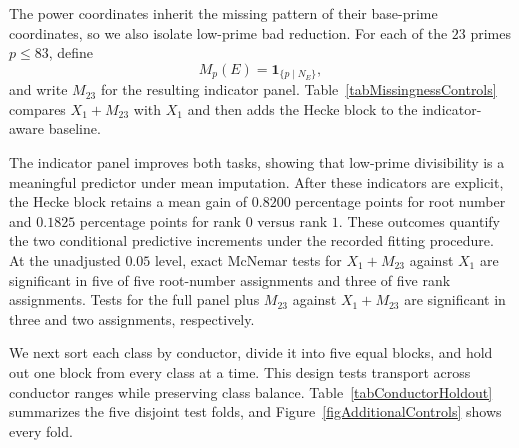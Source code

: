 \documentclass[12pt,reqno]{amsart}
\numberwithin{equation}{section}
\theoremstyle{plain}
\theoremstyle{definition}
\theoremstyle{remark}
\begin{document}
The power coordinates inherit the missing pattern of their base-prime coordinates, so we also isolate low-prime bad reduction.
For each of the $23$ primes $p\leq83$, define
\begin{equation*}
M_p(E)={\boldsymbol 1}_{\{p\mid N_E\}},
\end{equation*}
and write $M_{23}$ for the resulting indicator panel.
Table~\ref{tabMissingnessControls} compares $X_1+M_{23}$ with $X_1$ and then adds the Hecke block to the indicator-aware baseline.

\begin{table}[t]
\centering
\caption{Explicit low-prime missingness controls over the five matched random assignments.
Accuracy and changes use the same units as Table~\ref{tabAdditionalRandom}; parenthetical fractions count positive changes.}
\label{tabMissingnessControls}
\end{table}

The indicator panel improves both tasks, showing that low-prime divisibility is a meaningful predictor under mean imputation.
After these indicators are explicit, the Hecke block retains a mean gain of $0.8200$ percentage points for root number and $0.1825$ percentage points for rank $0$ versus rank $1$.
These outcomes quantify the two conditional predictive increments under the recorded fitting procedure.
At the unadjusted $0.05$ level, exact McNemar tests for $X_1+M_{23}$ against $X_1$ are significant in five of five root-number assignments and three of five rank assignments.
Tests for the full panel plus $M_{23}$ against $X_1+M_{23}$ are significant in three and two assignments, respectively.

We next sort each class by conductor, divide it into five equal blocks, and hold out one block from every class at a time.
This design tests transport across conductor ranges while preserving class balance.
Table~\ref{tabConductorHoldout} summarizes the five disjoint test folds, and Figure~\ref{figAdditionalControls} shows every fold.
\end{document}
